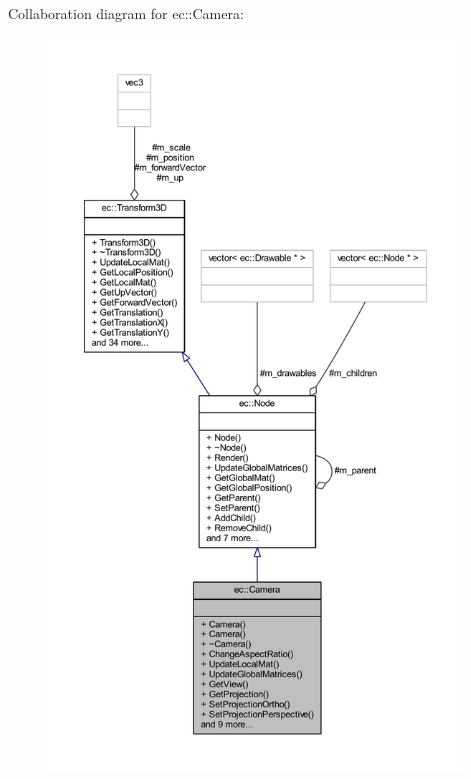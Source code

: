 Collaboration diagram for ec\+:\+:Camera\+:
\nopagebreak
\begin{figure}[H]
\begin{center}
\leavevmode
\includegraphics[height=550pt]{classec_1_1_camera__coll__graph}
\end{center}
\end{figure}
